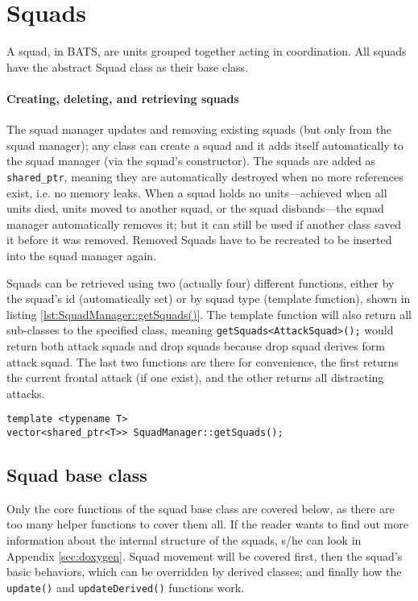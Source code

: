 \section{Squads}
A squad, in BATS, are units grouped together acting in coordination. All squads have the abstract Squad class as their base class. 

\paragraph{Creating, deleting, and retrieving squads}
The squad manager updates and removing existing squads (but only from the squad manager); any class can create a squad and it adds itself automatically to the squad manager (via the squad's constructor). The squads are added as \texttt{shared\_ptr}, meaning they are automatically destroyed when no more references exist, i.e. no memory leaks. When a squad holds no units—achieved when all units died, units moved to another squad, or the squad disbands—the squad manager automatically removes it; but it can still be used if another class saved it before it was removed. Removed Squads have to be recreated to be inserted into the squad manager again.

Squads can be retrieved using two (actually four) different functions, either by the squad's id (automatically set) or by squad type (template function), shown in listing \ref{lst:SquadManager::getSquads()}. The template function will also return all sub-classes to the specified class, meaning \texttt{getSquads<AttackSquad>();} would return both attack squads and drop squads because drop squad derives form attack squad. The last two functions are there for convenience, the first returns the current frontal attack (if one exist), and the other returns all distracting attacks.
\begin{lstlisting}[caption={Template function to retrieve squads of the specified type},label={lst:SquadManager::getSquads()}]
template <typename T>
vector<shared_ptr<T>> SquadManager::getSquads();
\end{lstlisting}

\subsection{Squad base class}
Only the core functions of the squad base class are covered below, as there are too many helper functions to cover them all. If the reader wants to find out more information about the internal structure of the squads, s/he can look in Appendix \ref{sec:doxygen}. Squad movement will be covered first, then the squad's basic behaviors, which can be overridden by derived classes; and finally how the \texttt{update()} and \texttt{updateDerived()} functions work.

